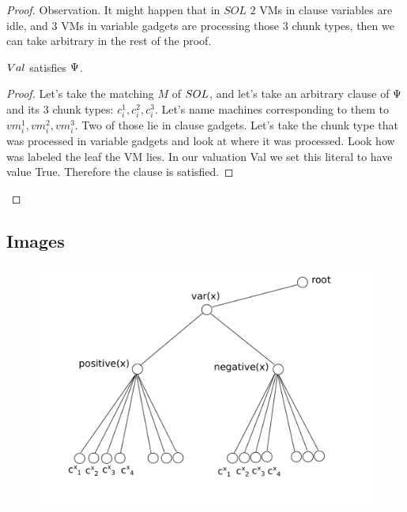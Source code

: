 \begin{proof}
Observation. It might happen that in $SOL$ $2$ VMs in
clause variables are idle, and $3$ VMs in variable gadgets are
processing those $3$ chunk types, then we can take arbitrary in the rest
of the proof.

\begin{lemma}
$Val$ satisfies $\Psi$.
\end{lemma}
\begin{proof}
Let's take the matching $M$ of $SOL$, and let's take an arbitrary clause of
$\Psi$ and its $3$ chunk types: $c_i^1, c_i^2, c_i^3$. Let's name machines corresponding to them
to $vm_i^1, vm_i^2, vm_i^3$. Two of those lie in clause gadgets. Let's
take the chunk type that was processed in variable
gadgets and look at where it was processed. Look how was labeled the
leaf the VM lies. In our valuation Val we set this literal to have
value True. Therefore the clause is satisfied.
\end{proof}
\end{proof}

\subsection{Images}

\begin{figure}[htbp]
\includegraphics[width = \columnwidth]{figs/gadget-no-bw}
\end{figure}


